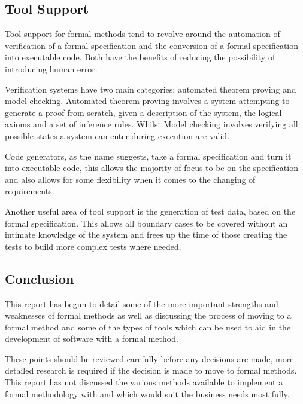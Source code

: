 \documentclass[10pt, a4paper, notitlepage, fleqn]{article}
\begin{document}
\subsection*{Tool Support}
Tool support for formal methods tend to revolve around the automation of verification of a formal
specification and the conversion of a formal specification into executable code. Both have the
benefits of reducing the possibility of introducing human error.

Verification systems have two main categories; automated theorem proving and model checking. 
Automated theorem proving involves a system attempting to generate a proof from scratch, given a 
description of the system, the logical axioms and a set of inference rules. Whilst Model checking 
involves verifying all possible states a system can enter during execution are valid.

Code generators, as the name suggests, take a formal specification and turn it into executable 
code, this allows the majority of focus to be on the specification and also allows for some 
flexibility when it comes to the changing of requirements.

Another useful area of tool support is the generation of test data, based on the formal 
specification. This allows all boundary cases to be covered without an intimate knowledge of the
system and frees up the time of those creating the tests to build more complex tests where needed.

\subsection*{Conclusion}
This report has begun to detail some of the more important strengths and weaknesses of formal 
methods as well as discussing the process of moving to a formal method and some of the types of
tools which can be used to aid in the development of software with a formal method.

These points should be reviewed carefully before any decisions are made, more detailed research is
required if the decision is made to move to formal methods. This report has not discussed the 
various methods available to implement a formal methodology with and which would suit the business
needs most fully.



\end{document}
